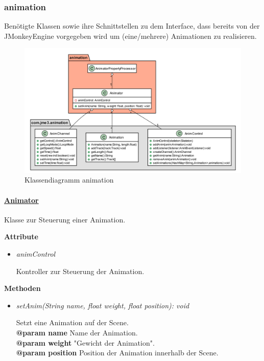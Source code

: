 \subsubsection{animation}
    Benötigte Klassen sowie ihre Schnittstellen zu dem Interface, dass bereits von der 
    JMonkeyEngine vorgegeben wird um (eine/mehrere) Animationen zu realisieren. \par
    \begin{figure}[htbp]
        \centering
        \includegraphics[width=1\linewidth]{InGameGrafik/Bilder/animation.png}
        \caption{Klassendiagramm animation}
    \end{figure}
    \paragraph{\underline{Animator}} \mbox{}\par
                Klasse zur Steuerung einer Animation.\par
                
                \textbf{Attribute}
                \begin{itemize}
                    \item  \textit{animControl} 
                        \begin{leftbar}[0.9\linewidth]
                        Kontroller zur Steuerung der Animation.  
                        \end{leftbar}
                \end{itemize}

                \textbf{Methoden}					
                \begin{itemize}
                    \item  \textit{setAnim(String name, float weight, float position): void}
                        \begin{leftbar}[0.9\linewidth]
                            Setzt eine Animation auf der Scene.\\
                            \textbf{@param name} Name der Animation.\\
                            \textbf{@param weight} "Gewicht der Animation".\\
                            \textbf{@param position} Position der Animation innerhalb der Scene.
                        \end{leftbar}   
                \end{itemize}
\pagebreak